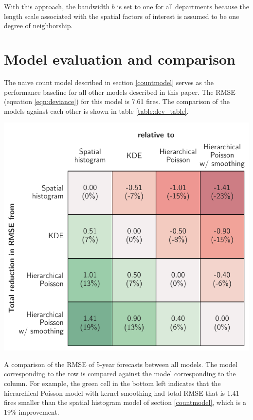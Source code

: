 \documentclass{svjour3}
\begin{document}
  
  With this approach, the bandwidth $b$ is set to one for all departments because the length scale associated with the spatial factors of interest is assumed to be one degree of neighborship. 
 
 
 \section{Model evaluation and comparison}
 The naive count model described in section \ref{countmodel} serves as the performance baseline for all other models described in this paper. The RMSE (equation \ref{eqn:deviance}) for this model is 7.61 fires. The comparison of the models against each other is shown in table \ref{table:dev_table}. 

    \begin{table}[htb] \centering
    \includegraphics[width=.75\textwidth]{figures/dev_table.pdf}
    \caption{A comparison of the RMSE of 5-year forecasts between all models. The model corresponding to the row is compared against the model corresponding to the column. For example, the green cell in the bottom left indicates that the hierarchical Poisson model with kernel smoothing had total RMSE that is 1.41 fires smaller than the spatial histogram model of section \protect\ref{countmodel}, which is a 19\% improvement.}
    \label{table:dev_table}
    \end{table}
  
\end{document}
